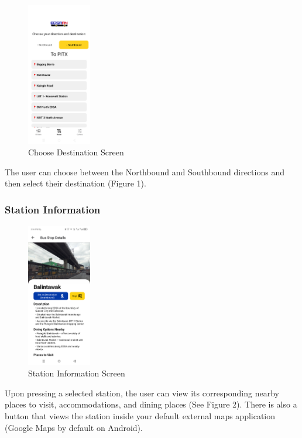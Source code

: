 \documentclass[journal]{./IEEE/IEEEtran}
\begin{document}
\begin{figure}[htbp]
  \centering
  \includegraphics[width=0.25\textwidth]{ICS-template/screenshots/EDSAan_browse.png}
  \caption{Choose Destination Screen}
  \label{fig:yourlabel}
\end{figure}

The user can choose between the Northbound and Southbound directions and then select their destination (Figure 1).

\subsubsection{\textbf{Station Information}}

\begin{figure}[htbp]
  \centering
  \includegraphics[width=0.25\textwidth]{ICS-template/screenshots/EDSAan_stationinfo.png}
  \caption{Station Information Screen}
  \label{fig:yourlabel}
\end{figure}

Upon pressing a selected station, the user can view its corresponding nearby places to visit, accommodations, and dining places (See Figure 2). There is also a button that views the station inside your default external maps application (Google Maps by default on Android).
\end{document}
